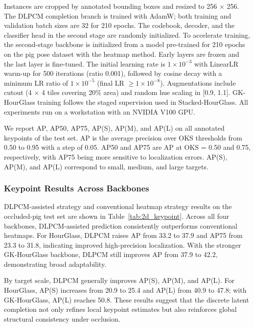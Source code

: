 \documentclass[computers,article,submit,pdftex,moreauthors]{Definitions/mdpi}
\begin{document}
Instances are cropped by annotated bounding boxes and resized to 256 $\times$ 256. The DLPCM completion branch is trained with AdamW; both training and validation batch sizes are 32 for 210 epochs. The codebook, decoder, and the classifier head in the second stage are randomly initialized. To accelerate training, the second-stage backbone is initialized from a model pre-trained for 210 epochs on the pig pose dataset with the heatmap method. Early layers are frozen and the last layer is fine-tuned. The initial learning rate is $1 \times 10^{-3}$ with LinearLR warm-up for 500 iterations (ratio 0.001), followed by cosine decay with a minimum LR ratio of $1 \times 10^{-5}$ (final LR $\geq 1 \times 10^{-8}$). Augmentations include cutout (4 $\times$ 4 tiles covering 20\% area) and random hue scaling in [0.9, 1.1]. GK-HourGlass training follows the staged supervision used in Stacked-HourGlass. All experiments run on a workstation with an NVIDIA V100 GPU.

We report AP, AP50, AP75, AP(S), AP(M), and AP(L) on all annotated keypoints of the test set. AP is the average precision over OKS thresholds from 0.50 to 0.95 with a step of 0.05. AP50 and AP75 are AP at OKS = 0.50 and 0.75, respectively, with AP75 being more sensitive to localization errors. AP(S), AP(M), and AP(L) correspond to small, medium, and large targets.

\subsubsection{Keypoint Results Across Backbones}\label{sec:2d_results}

DLPCM-assisted strategy and conventional heatmap strategy results on the occluded-pig test set are shown in Table~\ref{tab:2d_keypoint}. Across all four backbones, DLPCM-assisted prediction consistently outperforms conventional heatmaps. For HourGlass, DLPCM raises AP from 33.2 to 37.9 and AP75 from 23.3 to 31.8, indicating improved high-precision localization. With the stronger GK-HourGlass backbone, DLPCM still improves AP from 37.9 to 42.2, demonstrating broad adaptability.

By target scale, DLPCM generally improves AP(S), AP(M), and AP(L). For HourGlass, AP(S) increases from 20.9 to 25.4 and AP(L) from 40.9 to 47.8; with GK-HourGlass, AP(L) reaches 50.8. These results suggest that the discrete latent completion not only refines local keypoint estimates but also reinforces global structural consistency under occlusion.
\end{document}
